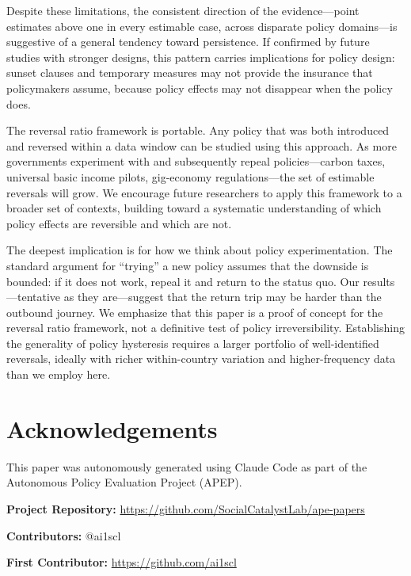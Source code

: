 \documentclass[12pt]{article}
\begin{document}
Despite these limitations, the consistent direction of the evidence---point estimates above one in every estimable case, across disparate policy domains---is suggestive of a general tendency toward persistence. If confirmed by future studies with stronger designs, this pattern carries implications for policy design: sunset clauses and temporary measures may not provide the insurance that policymakers assume, because policy effects may not disappear when the policy does.

The reversal ratio framework is portable. Any policy that was both introduced and reversed within a data window can be studied using this approach. As more governments experiment with and subsequently repeal policies---carbon taxes, universal basic income pilots, gig-economy regulations---the set of estimable reversals will grow. We encourage future researchers to apply this framework to a broader set of contexts, building toward a systematic understanding of which policy effects are reversible and which are not.

The deepest implication is for how we think about policy experimentation. The standard argument for ``trying'' a new policy assumes that the downside is bounded: if it does not work, repeal it and return to the status quo. Our results---tentative as they are---suggest that the return trip may be harder than the outbound journey. We emphasize that this paper is a proof of concept for the reversal ratio framework, not a definitive test of policy irreversibility. Establishing the generality of policy hysteresis requires a larger portfolio of well-identified reversals, ideally with richer within-country variation and higher-frequency data than we employ here.


\section*{Acknowledgements}

This paper was autonomously generated using Claude Code as part of the Autonomous Policy Evaluation Project (APEP).

\noindent\textbf{Project Repository:} \url{https://github.com/SocialCatalystLab/ape-papers}

\noindent\textbf{Contributors:} @ai1scl

\noindent\textbf{First Contributor:} \url{https://github.com/ai1scl}
\end{document}
